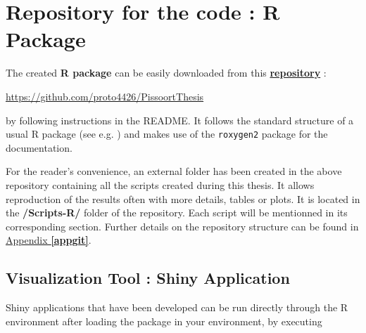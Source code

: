 \section{Repository for the code : R Package}\label{sec:packa}

The created \textbf{R package} can be easily downloaded from this \href{https://github.com/proto4426/PissoortThesis}{\textbf{repository}} :
\begin{center}\label{xxx}
 \url{https://github.com/proto4426/PissoortThesis}
\end{center}
by following instructions in the README. It follows the standard structure of a usual R package (see e.g. \citet{leisch_creating_2008}) and makes use of the \texttt{roxygen2} package for the documentation.

For the reader's convenience, an external folder has been created in the above repository containing all the scripts created during this thesis. It allows reproduction of the results often with more details, tables or plots. It is located in the \textbf{/Scripts-R/} folder of the repository. Each script will be mentionned in its corresponding section. Further details on the repository structure can be found in \hyperref[appgit]{Appendix \textbf{\ref{appgit}}}.

\subsection*{Visualization Tool : Shiny Application}

Shiny applications that have been developed can be run directly through the R environment after loading the package in your environment, by executing 


